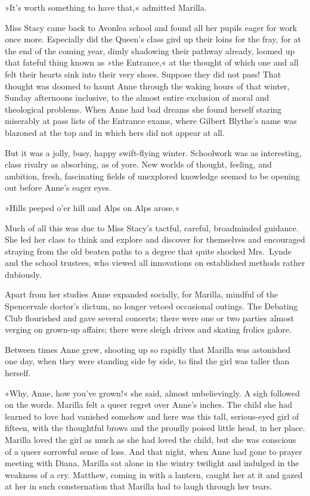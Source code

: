 »It's worth something to have that,« admitted Marilla.

Miss Stacy came back to Avonlea school and found all her pupils eager for work once more. Especially did the Queen's class gird up their loins for the fray, for at the end of the coming year, dimly shadowing their pathway already, loomed up that fateful thing known as »the Entrance,« at the thought of which one and all felt their hearts sink into their very shoes. Suppose they did not pass! That thought was doomed to haunt Anne through the waking hours of that winter, Sunday afternoons inclusive, to the almost entire exclusion of moral and theological problems. When Anne had bad dreams she found herself staring miserably at pass lists of the Entrance exams, where Gilbert Blythe's name was blazoned at the top and in which hers did not appear at all.

But it was a jolly, busy, happy swift-flying winter. Schoolwork was as interesting, class rivalry as absorbing, as of yore. New worlds of thought, feeling, and ambition, fresh, fascinating fields of unexplored knowledge seemed to be opening out before Anne's eager eyes.

»Hills peeped o'er hill and Alps on Alps arose.«

Much of all this was due to Miss Stacy's tactful, careful, broadminded guidance. She led her class to think and explore and discover for themselves and encouraged straying from the old beaten paths to a degree that quite shocked Mrs.~Lynde and the school trustees, who viewed all innovations on established methods rather dubiously.

Apart from her studies Anne expanded socially, for Marilla, mindful of the Spencervale doctor's dictum, no longer vetoed occasional outings. The Debating Club flourished and gave several concerts; there were one or two parties almost verging on grown-up affairs; there were sleigh drives and skating frolics galore.

Between times Anne grew, shooting up so rapidly that Marilla was astonished one day, when they were standing side by side, to find the girl was taller than herself.

»Why, Anne, how you've grown!« she said, almost unbelievingly. A sigh followed on the words. Marilla felt a queer regret over Anne's inches. The child she had learned to love had vanished somehow and here was this tall, serious-eyed girl of fifteen, with the thoughtful brows and the proudly poised little head, in her place. Marilla loved the girl as much as she had loved the child, but she was conscious of a queer sorrowful sense of loss. And that night, when Anne had gone to prayer meeting with Diana, Marilla sat alone in the wintry twilight and indulged in the weakness of a cry. Matthew, coming in with a lantern, caught her at it and gazed at her in such consternation that Marilla had to laugh through her tears.


